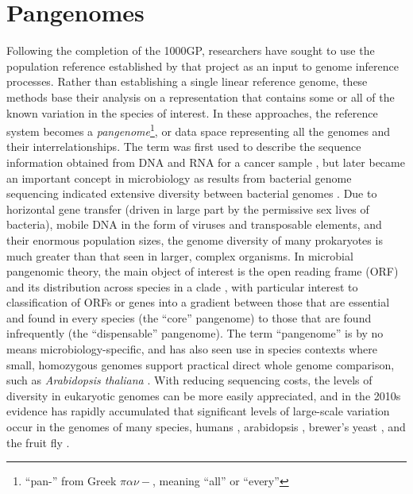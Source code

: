 


\section{Pangenomes}

Following the completion of the 1000GP, researchers have sought to use the population reference established by that project as an input to genome inference processes.
Rather than establishing a single linear reference genome, these methods base their analysis on a representation that contains some or all of the known variation in the species of interest.
In these approaches, the reference system becomes a \emph{pangenome}\footnote{``pan-'' from Greek $\pi\alpha\nu-$, meaning ``all'' or ``every''}, or data space representing all the genomes and their interrelationships.
The term was first used to describe the sequence information obtained from DNA and RNA for a cancer sample \cite{sigaux2000cancer}, but later became an important concept in microbiology as results from bacterial genome sequencing indicated extensive diversity between bacterial genomes \cite{tettelin2005genome,medini2005microbial}.
Due to horizontal gene transfer (driven in large part by the permissive sex lives of bacteria), mobile DNA in the form of viruses and transposable elements, and their enormous population sizes, the genome diversity of many prokaryotes is much greater than that seen in larger, complex organisms.
In microbial pangenomic theory, the main object of interest is the open reading frame (ORF) and its distribution across species in a clade \cite{vernikos2015ten}, with particular interest to classification of ORFs or genes into a gradient between those that are essential and found in every species (the ``core'' pangenome) to those that are found infrequently (the ``dispensable'' pangenome).
The term ``pangenome'' is by no means microbiology-specific, and has also seen use in species contexts where small, homozygous genomes support practical direct whole genome comparison, such as \emph{Arabidopsis thaliana} \cite{cao2011whole}.
With reducing sequencing costs, the levels of diversity in eukaryotic genomes can be more easily appreciated, and in the 2010s evidence has rapidly accumulated that significant levels of large-scale variation occur in the genomes of many species, humans \cite{li2010building,sudmant2010,sudmant2015integrated,chaisson2018multi}, arabidopsis \cite{alonso2016arabidopsis}, brewer's yeast \cite{yue2017contrasting}, and the fruit fly \cite{chakraborty2018hidden}.


